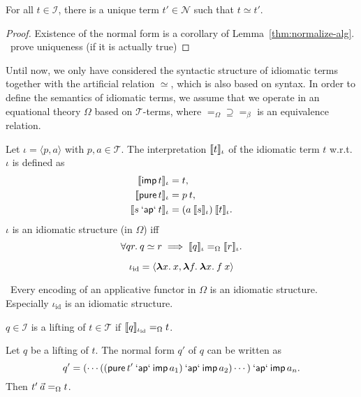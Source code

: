 \begin{lemma}
For all $t \in \mathcal{I}$, there is a unique term $t' \in \mathcal{N}$ such
that $t \simeq t'$.
\end{lemma}
\begin{proof}
Existence of the normal form is a corollary of Lemma~\ref{thm:normalize-alg}.
\todo\ prove uniqueness (if it is actually true)
\end{proof}

Until now, we only have considered the syntactic structure of idiomatic terms
together with the artificial relation $\simeq$, which is also based on syntax.
In order to define the semantics of idiomatic terms, we assume that we operate
in an equational theory $\Omega$ based on $\mathcal{T}$-terms, where
$=_\Omega \supseteq =_\beta$ is an equivalence relation.

\begin{definition}
Let $\iota = \langle p, a \rangle$ with $p,a \in \mathcal{T}$.
The interpretation $\llbracket t \rrbracket_\iota$ of the idiomatic term $t$ w.r.t. $\iota$
is defined as
\begin{align}
	\llbracket \operatorname{\mathsf{imp}} t \rrbracket_\iota &= t, \\
	\llbracket \operatorname{\mathsf{pure}} t \rrbracket_\iota &= p \> t, \\
	\llbracket s \mathbin{\mathsf{`ap`}} t \rrbracket_\iota &= (a \> \llbracket s \rrbracket_\iota) \> \llbracket t \rrbracket_\iota.
\end{align}
$\iota$ is an idiomatic structure (in $\Omega$) iff
\begin{equation}
	\forall q r.\>q \simeq r \implies \llbracket q \rrbracket_\iota =_\Omega \llbracket r \rrbracket_\iota.
\end{equation}
\end{definition}

\begin{definition}
\begin{equation}
	\iota_\mathrm{id} = \langle {\boldsymbol\lambda} x.\>x, {\boldsymbol\lambda} f.\>{\boldsymbol\lambda} x.\>f \> x \rangle
\end{equation}
\end{definition}

\begin{lemma}
\todo\ Every encoding of an applicative functor in $\Omega$ is an idiomatic
structure.
Especially $\iota_\mathrm{id}$ is an idiomatic structure.
\end{lemma}

\begin{definition}
$q \in \mathcal{I}$ is a lifting of $t \in \mathcal{T}$ if 
$\llbracket q \rrbracket_{\iota_\mathrm{id}} =_\Omega t$.
\end{definition}

\begin{lemma}
Let $q$ be a lifting of $t$. The normal form $q'$ of $q$ can be written as
\[ q' = ( \cdots ((\operatorname{\mathsf{pure}} t' \mathbin{\mathsf{`ap`}} \operatorname{\mathsf{imp}} a_1) \mathbin{\mathsf{`ap`}} \operatorname{\mathsf{imp}} a_2) \cdots ) \mathbin{\mathsf{`ap`}} \operatorname{\mathsf{imp}} a_n. \]
Then $t' \> \vec a =_\Omega t$.
\end{lemma}
\todo
